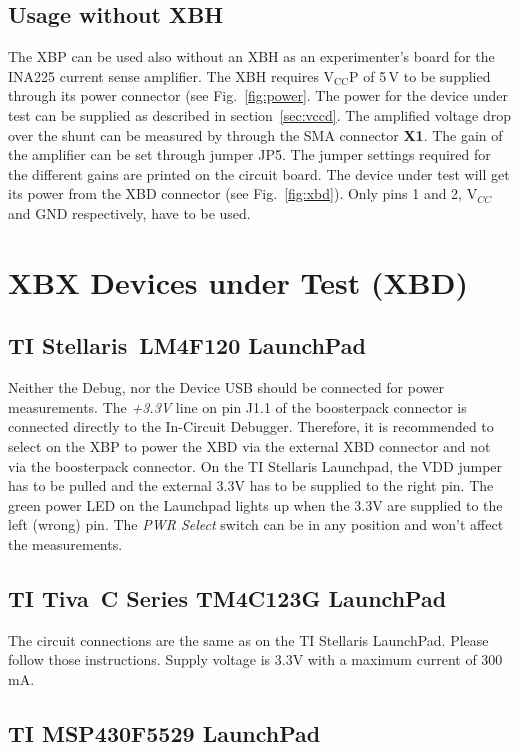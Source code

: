 \documentclass{article}
\begin{document}
\subsection{Usage without XBH}
The XBP can be used also without an XBH as an experimenter's board for the INA225 
current sense amplifier. The XBH requires $\mathrm{V_{CC}P}$ of 5\,V to be supplied
through its power connector (see Fig.~\ref{fig:power}. The power for the device 
under test can be supplied as described in section~\ref{sec:vccd}. The amplified
voltage drop over the shunt can be measured by through the SMA connector \textbf{X1}.
The gain of the amplifier can be set through jumper JP5. The jumper settings required
for the different gains are printed on the circuit board. The device under test will
get its power from the XBD connector (see Fig.~\ref{fig:xbd}). Only pins 1 and 2,
V$_{CC}$ and GND respectively, have to be used.

\section{XBX Devices under Test (XBD)}\label{sec:xbd}
\subsection{TI Stellaris\textregistered~LM4F120 LaunchPad}

Neither the Debug, nor the Device USB should be connected for power measurements.
The \emph{+3.3V} line on pin J1.1 of the boosterpack connector is connected 
directly to the In-Circuit Debugger. Therefore, it is recommended to select on the
XBP to power the XBD via the external XBD connector and not via the boosterpack
connector. On the TI Stellaris Launchpad, the VDD jumper has to be pulled and the
external 3.3V has to be supplied to the right pin. The green power LED on the
Launchpad lights up when the 3.3V are supplied to the left (wrong) pin. 
The \emph{PWR Select} switch can be in any position and won't affect the 
measurements.

\subsection{TI Tiva\texttrademark~C Series TM4C123G LaunchPad}

The circuit connections are the same as on the TI Stellaris LaunchPad. Please follow
those instructions. Supply voltage is 3.3V with a maximum current of 300\,mA.

\subsection{TI MSP430F5529 LaunchPad\texttrademark}
\end{document}
